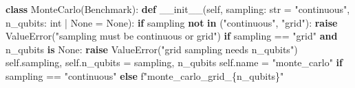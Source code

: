 \documentclass[
  10pt,
]{article}
\newenvironment{Shaded}{}{}
\newcommand{\BuiltInTok}[1]{\textcolor[rgb]{0.00,0.50,0.00}{#1}}
\newcommand{\ControlFlowTok}[1]{\textcolor[rgb]{0.00,0.44,0.13}{\textbf{#1}}}
\newcommand{\FunctionTok}[1]{\textcolor[rgb]{0.02,0.16,0.49}{#1}}
\newcommand{\KeywordTok}[1]{\textcolor[rgb]{0.00,0.44,0.13}{\textbf{#1}}}
\newcommand{\NormalTok}[1]{#1}
\newcommand{\OperatorTok}[1]{\textcolor[rgb]{0.40,0.40,0.40}{#1}}
\newcommand{\PreprocessorTok}[1]{\textcolor[rgb]{0.74,0.48,0.00}{#1}}
\newcommand{\SpecialCharTok}[1]{\textcolor[rgb]{0.25,0.44,0.63}{#1}}
\newcommand{\SpecialStringTok}[1]{\textcolor[rgb]{0.73,0.40,0.53}{#1}}
\newcommand{\StringTok}[1]{\textcolor[rgb]{0.25,0.44,0.63}{#1}}
\newcommand{\VariableTok}[1]{\textcolor[rgb]{0.10,0.09,0.49}{#1}}
\begin{document}
\begin{Shaded}
\begin{Highlighting}[]
\KeywordTok{class}\NormalTok{ MonteCarlo(Benchmark):}
    \KeywordTok{def} \FunctionTok{\_\_init\_\_}\NormalTok{(}\VariableTok{self}\NormalTok{, sampling: }\BuiltInTok{str} \OperatorTok{=} \StringTok{"continuous"}\NormalTok{, n\_qubits: }\BuiltInTok{int} \OperatorTok{|} \VariableTok{None} \OperatorTok{=} \VariableTok{None}\NormalTok{):}
        \ControlFlowTok{if}\NormalTok{ sampling }\KeywordTok{not} \KeywordTok{in}\NormalTok{ (}\StringTok{"continuous"}\NormalTok{, }\StringTok{"grid"}\NormalTok{):}
            \ControlFlowTok{raise} \PreprocessorTok{ValueError}\NormalTok{(}\StringTok{"sampling must be \textquotesingle{}continuous\textquotesingle{} or \textquotesingle{}grid\textquotesingle{}"}\NormalTok{)}
        \ControlFlowTok{if}\NormalTok{ sampling }\OperatorTok{==} \StringTok{"grid"} \KeywordTok{and}\NormalTok{ n\_qubits }\KeywordTok{is} \VariableTok{None}\NormalTok{:}
            \ControlFlowTok{raise} \PreprocessorTok{ValueError}\NormalTok{(}\StringTok{"grid sampling needs n\_qubits"}\NormalTok{)}
        \VariableTok{self}\NormalTok{.sampling, }\VariableTok{self}\NormalTok{.n\_qubits }\OperatorTok{=}\NormalTok{ sampling, n\_qubits}
        \VariableTok{self}\NormalTok{.name }\OperatorTok{=} \StringTok{"monte\_carlo"} \ControlFlowTok{if}\NormalTok{ sampling }\OperatorTok{==} \StringTok{"continuous"} \ControlFlowTok{else} \SpecialStringTok{f"monte\_carlo\_grid\_}\SpecialCharTok{\{}\NormalTok{n\_qubits}\SpecialCharTok{\}}\SpecialStringTok{"}


\end{Highlighting}
\end{Shaded}
\end{document}
